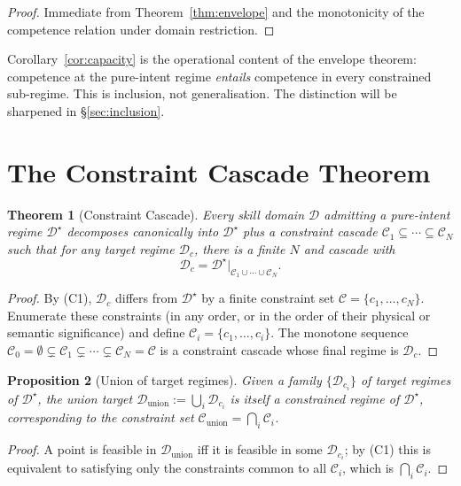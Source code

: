\documentclass[twocolumn,11pt,a4paper]{article}
\newtheorem{theorem}{Theorem}[section]
\newtheorem{proposition}[theorem]{Proposition}
\newcommand{\cD}{\mathcal{D}}
\newcommand{\cC}{\mathcal{C}}
\begin{document}
\begin{proof}
Immediate from Theorem~\ref{thm:envelope} and the monotonicity of the competence relation under domain restriction.
\end{proof}

Corollary~\ref{cor:capacity} is the operational content of the envelope theorem: competence at the pure-intent regime \emph{entails} competence in every constrained sub-regime. This is inclusion, not generalisation. The distinction will be sharpened in \S\ref{sec:inclusion}.


\section{The Constraint Cascade Theorem}
\label{sec:cascade-theorem}

\begin{theorem}[Constraint Cascade]
\label{thm:cascade}
Every skill domain $\cD$ admitting a pure-intent regime $\cD^\star$ decomposes canonically into $\cD^\star$ plus a constraint cascade $\cC_1 \subseteq \cdots \subseteq \cC_N$ such that for any target regime $\cD_c$, there is a finite $N$ and cascade with
\begin{equation}
\cD_c = \cD^\star|_{\cC_1 \cup \cdots \cup \cC_N}.
\end{equation}
\end{theorem}

\begin{proof}
By (C1), $\cD_c$ differs from $\cD^\star$ by a finite constraint set $\cC = \{c_1, \ldots, c_N\}$. Enumerate these constraints (in any order, or in the order of their physical or semantic significance) and define $\cC_i = \{c_1, \ldots, c_i\}$. The monotone sequence $\cC_0 = \emptyset \subsetneq \cC_1 \subsetneq \cdots \subsetneq \cC_N = \cC$ is a constraint cascade whose final regime is $\cD_c$.
\end{proof}

\begin{proposition}[Union of target regimes]
\label{prop:union}
Given a family $\{\cD_{c_i}\}$ of target regimes of $\cD^\star$, the \emph{union target} $\cD_{\mathrm{union}} := \bigcup_i \cD_{c_i}$ is itself a constrained regime of $\cD^\star$, corresponding to the constraint set $\cC_{\mathrm{union}} = \bigcap_i \cC_i$.
\end{proposition}

\begin{proof}
A point is feasible in $\cD_{\mathrm{union}}$ iff it is feasible in some $\cD_{c_i}$; by (C1) this is equivalent to satisfying only the constraints common to all $\cC_i$, which is $\bigcap_i \cC_i$.
\end{proof}
\end{document}
